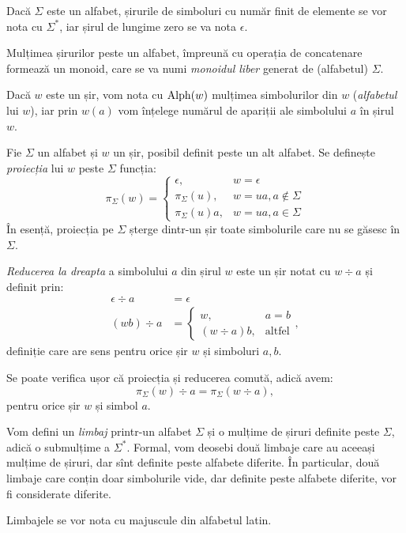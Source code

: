 Dacă $ \Sigma $ este un alfabet, șirurile de simboluri cu număr finit
de elemente se vor nota cu $ \Sigma^\ast $, iar șirul de lungime
zero se va nota $ \epsilon $.

Mulțimea șirurilor peste un alfabet, împreună cu operația de concatenare
formează un monoid, care se va numi \emph{monoidul liber} generat de
(alfabetul) $ \Sigma $.

Dacă $ w $ este un șir, vom nota cu $ \mathrm{Alph}(w) $ mulțimea
simbolurilor din $ w $ (\emph{alfabetul} lui $ w $), iar prin
$ w(a) $ vom înțelege numărul de apariții ale simbolului $ a $ în
șirul $ w $.

Fie $ \Sigma $ un alfabet și $ w $ un șir, posibil definit peste
un alt alfabet. Se definește \emph{proiecția} lui $ w $ peste $ \Sigma $
funcția:
\[
    \pi_\Sigma(w) = %
    \begin{cases}
        \epsilon, & w = \epsilon \\
        \pi_\Sigma(u), & w = ua, a \notin \Sigma \\
        \pi_\Sigma(u)a, & w = ua, a \in \Sigma
    \end{cases}
\]
În esență, proiecția pe $ \Sigma $ șterge dintr-un șir toate simbolurile
care nu se găsesc în $ \Sigma $.

\emph{Reducerea la dreapta} a simbolului $ a $ din șirul $ w $ este
un șir notat cu $ w \div a $ și definit prin:
\begin{align*}
    \epsilon \div a &= \epsilon \\
    (wb) \div a &= %
    \begin{cases}
        w, & a = b \\
        (w \div a) b, &\text{altfel}
    \end{cases},
\end{align*}
definiție care are sens pentru orice șir $ w $ și simboluri $ a, b $.

Se poate verifica ușor că proiecția și reducerea comută, adică avem:
\[
    \pi_\Sigma(w)\div a = \pi_\Sigma(w \div a),
\]
pentru orice șir $ w $ și simbol $ a $.

Vom defini un \emph{limbaj} printr-un alfabet $ \Sigma $ și o
mulțime de șiruri definite peste $ \Sigma $, adică o submulțime a
$ \Sigma^\ast $. Formal, vom deosebi două limbaje care au aceeași
mulțime de șiruri, dar sînt definite peste alfabete diferite. În
particular, două limbaje care conțin doar simbolurile vide, dar
definite peste alfabete diferite, vor fi considerate diferite.

Limbajele se vor nota cu majuscule din alfabetul latin.

